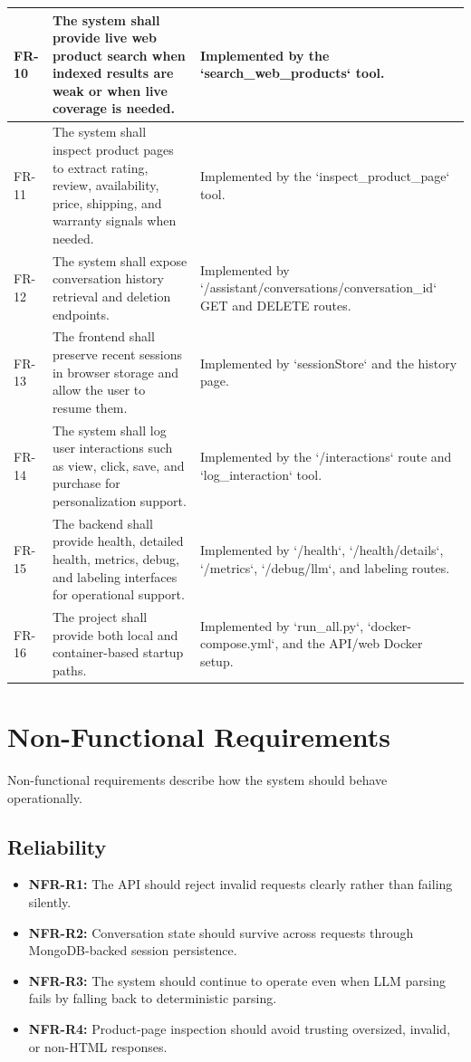 \documentclass[12pt,a4paper,oneside]{report}
\begin{document}
\begin{longtable}{|C{0.08\textwidth}|L{0.31\textwidth}|L{0.43\textwidth}|}
\hline
FR-10 & The system shall provide live web product search when indexed results are weak or when live coverage is needed. & Implemented by the `search\_web\_products` tool. \\
\hline
FR-11 & The system shall inspect product pages to extract rating, review, availability, price, shipping, and warranty signals when needed. & Implemented by the `inspect\_product\_page` tool. \\
\hline
FR-12 & The system shall expose conversation history retrieval and deletion endpoints. & Implemented by `/assistant/conversations/{conversation\_id}` GET and DELETE routes. \\
\hline
FR-13 & The frontend shall preserve recent sessions in browser storage and allow the user to resume them. & Implemented by `sessionStore` and the history page. \\
\hline
FR-14 & The system shall log user interactions such as view, click, save, and purchase for personalization support. & Implemented by the `/interactions` route and `log\_interaction` tool. \\
\hline
FR-15 & The backend shall provide health, detailed health, metrics, debug, and labeling interfaces for operational support. & Implemented by `/health`, `/health/details`, `/metrics`, `/debug/llm`, and labeling routes. \\
\hline
FR-16 & The project shall provide both local and container-based startup paths. & Implemented by `run\_all.py`, `docker-compose.yml`, and the API/web Docker setup. \\
\hline
\end{longtable}
\endgroup

\section{Non-Functional Requirements}
Non-functional requirements describe how the system should behave operationally.

\subsection{Reliability}
\begin{itemize}[leftmargin=0.35in]
    \item \textbf{NFR-R1:} The API should reject invalid requests clearly rather than failing silently.
    \item \textbf{NFR-R2:} Conversation state should survive across requests through MongoDB-backed session persistence.
    \item \textbf{NFR-R3:} The system should continue to operate even when LLM parsing fails by falling back to deterministic parsing.
    \item \textbf{NFR-R4:} Product-page inspection should avoid trusting oversized, invalid, or non-HTML responses.
\end{itemize}
\end{document}

